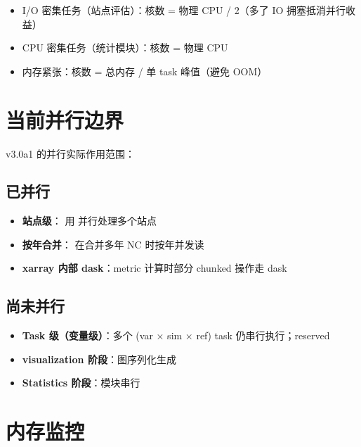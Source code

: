 \begin{itemize}
  \item I/O 密集任务（站点评估）：核数 = 物理 CPU / 2（多了 IO 拥塞抵消并行收益）
  \item CPU 密集任务（统计模块）：核数 = 物理 CPU
  \item 内存紧张：核数 = 总内存 / 单 task 峰值（避免 OOM）
\end{itemize}

\section{当前并行边界}

\openbench{} v3.0a1 的并行实际作用范围：

\subsection{已并行}

\begin{itemize}
  \item \textbf{站点级}： 用  并行处理多个站点
  \item \textbf{按年合并}： 在合并多年 NC 时按年并发读
  \item \textbf{xarray 内部 dask}：metric 计算时部分 chunked 操作走 dask
\end{itemize}

\subsection{尚未并行}

\begin{itemize}
  \item \textbf{Task 级（变量级）}：多个 (var × sim × ref) task 仍串行执行；reserved
  \item \textbf{visualization 阶段}：图序列化生成
  \item \textbf{Statistics 阶段}：模块串行
\end{itemize}


\section{内存监控}

